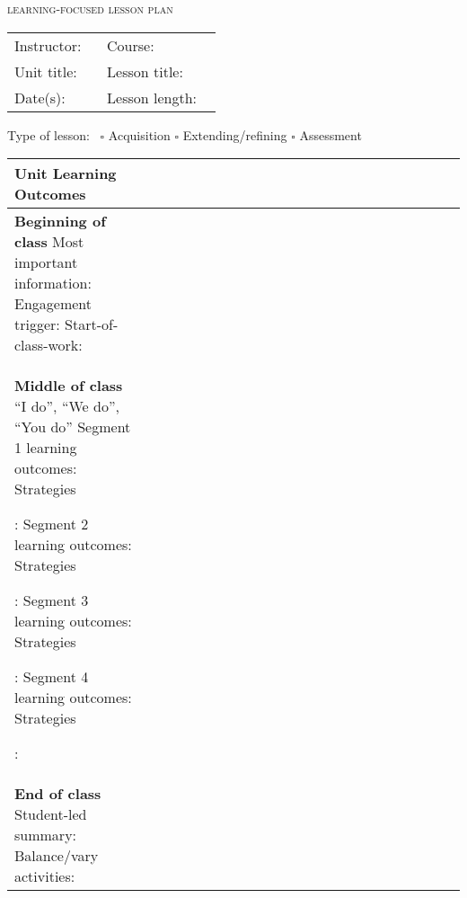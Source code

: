 \documentclass[letterpaper,11pt]{article}
\newcommand\B{\rule[-10ex]{0pt}{0pt}} %
\newcommand\textlcsc[1]{\textsc{\MakeLowercase{#1}}}
\begin{document}
\begin{center}
  \Large \textlcsc{Learning-focused lesson plan}
\end{center}

\vspace{5mm}

\begin{tabular}{p{0.4\linewidth} p{0.5\linewidth}}
  Instructor: & Course: \\
  Unit title: & Lesson title: \\
  Date(s): & Lesson length: \\
\end{tabular}

\vspace{5mm}
Type of lesson:~ $\square$ Acquisition \hspace{5mm} $\square$ Extending/refining  \hspace{5mm} $\square$ Assessment

\vspace{5mm}

\begin{tabular}{|p{0.3\linewidth} | p{0.7\linewidth}|}
  \hline
  \textbf{Unit Learning Outcomes} & \\
  \hline
  \textbf{Beginning of class}
  \newline Most important information:
  \newline Engagement trigger:
  \newline Start-of-class-work:
                                  & \\
  \hline
  \textbf{Middle of class}
  \newline ``I do'', ``We do'', ``You do''
  \newline Segment 1 learning outcomes:
  \newline Strategies \B:
  \newline Segment 2 learning outcomes:
  \newline Strategies \B:
  \newline Segment 3 learning outcomes:
  \newline Strategies \B:
  \newline Segment 4 learning outcomes:
  \newline Strategies \B:
                                  & \\
  \hline
  \textbf{End of class}
  \newline Student-led summary:
  \newline Balance/vary activities:
                                  & \\
  \hline
\end{tabular}
\end{document}
